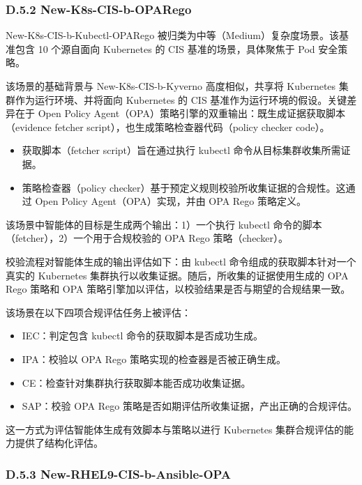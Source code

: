 \documentclass[10pt,UTF8,fontset=fandol]{ctexart}
\begin{document}
\subsubsection{D.5.2 New-K8s-CIS-b-OPARego}

New-K8s-CIS-b-Kubectl-OPARego 被归类为中等（Medium）复杂度场景。该基准包含 10 个源自面向 Kubernetes 的 CIS 基准的场景，具体聚焦于 Pod 安全策略。

该场景的基础背景与 New-K8s-CIS-b-Kyverno 高度相似，共享将 Kubernetes 集群作为运行环境、并将面向 Kubernetes 的 CIS 基准作为运行环境的假设。关键差异在于 Open Policy Agent（OPA）策略引擎的双重输出：既生成证据获取脚本（evidence fetcher script），也生成策略检查器代码（policy checker code）。

\begin{itemize}
\item 获取脚本（fetcher script）旨在通过执行 kubectl 命令从目标集群收集所需证据。
\item 策略检查器（policy checker）基于预定义规则校验所收集证据的合规性。这通过 Open Policy Agent（OPA）实现，并由 OPA Rego 策略定义。
\end{itemize}

该场景中智能体的目标是生成两个输出：1）一个执行 kubectl 命令的脚本（fetcher），2）一个用于合规校验的 OPA Rego 策略（checker）。

校验流程对智能体生成的输出评估如下：由 kubectl 命令组成的获取脚本针对一个真实的 Kubernetes 集群执行以收集证据。随后，所收集的证据使用生成的 OPA Rego 策略和 OPA 策略引擎加以评估，以校验结果是否与期望的合规结果一致。

该场景在以下四项合规评估任务上被评估：

\begin{itemize}
\item IEC：判定包含 kubectl 命令的获取脚本是否成功生成。
\item IPA：校验以 OPA Rego 策略实现的检查器是否被正确生成。
\item CE：检查针对集群执行获取脚本能否成功收集证据。
\item SAP：校验 OPA Rego 策略是否如期评估所收集证据，产出正确的合规评估。
\end{itemize}

这一方式为评估智能体生成有效脚本与策略以进行 Kubernetes 集群合规评估的能力提供了结构化评估。

\subsubsection{D.5.3 New-RHEL9-CIS-b-Ansible-OPA}
\end{document}
